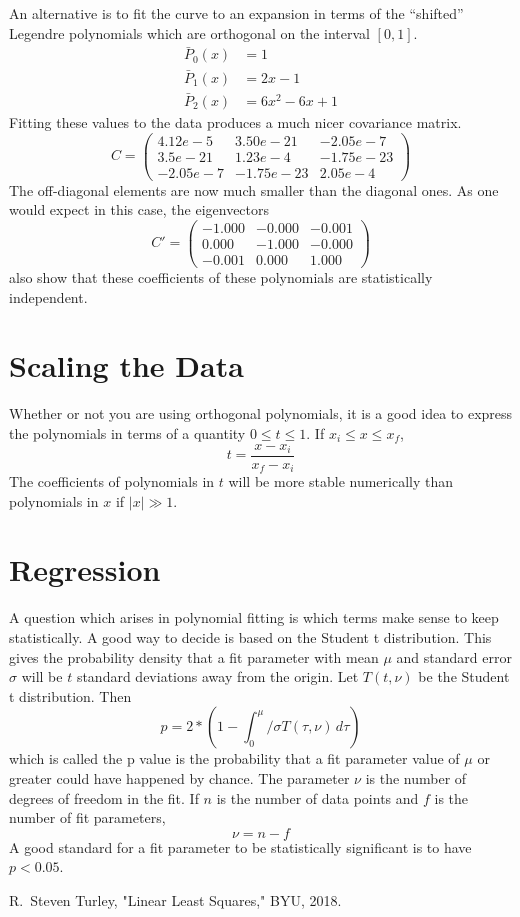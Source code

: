\documentclass{scrartcl}
\begin{document}
An alternative is to fit the curve to an expansion in terms
of the ``shifted'' Legendre polynomials which are orthogonal on
the interval $[0,1]$.
\begin{align}
\bar{P}_0(x) &= 1\\
\bar{P}_1(x) &= 2x-1\\
\bar{P}_2(x) &= 6x^2-6x+1
\end{align}
Fitting these values to the data produces a much nicer covariance
matrix.
\begin{equation}
C = \left(\begin{array}{ccc}
4.12e-5 & 3.50e-21 & -2.05e-7\\
3.5e-21 & 1.23e-4 & -1.75e-23\\
-2.05e-7 & -1.75e-23& 2.05e-4\end{array}\right)
\end{equation}
The off-diagonal elements are now much smaller than the diagonal
ones. As one would expect in this case, the eigenvectors
\begin{equation}
C' = \left(\begin{array}{ccc}
-1.000 & -0.000 & -0.001 \\
0.000 & -1.000 & -0.000 \\
-0.001 & 0.000 & 1.000\end{array}\right)
\end{equation}
also show that these coefficients of these polynomials are
statistically independent.
\section{Scaling the Data}
Whether or not you are using orthogonal polynomials, it is a good
idea to express the polynomials in terms of a quantity
$0\leq t\leq 1$. If $x_i\leq x\leq x_f$,
\begin{equation}
t = \frac{x-x_i}{x_f-x_i}
\end{equation}
The coefficients of polynomials in $t$ will be more stable
numerically than polynomials in $x$ if $|x|\gg 1$.

\section{Regression}
A question which arises in polynomial fitting is which terms
make sense to keep statistically. A good way to decide is based
on the Student t distribution. This gives the probability density
that a fit parameter with mean $\mu$ and standard error $\sigma$ will
be $t$ standard deviations away from the origin. Let
$T(t,\nu)$ be the Student t distribution. Then
\begin{equation}
p = 2*\left(1-\int_0^\mu/\sigma T(\tau,\nu)\,d\tau\right)
\end{equation}
which is called the p value is the probability that a fit
parameter value of $\mu$ or greater
could have happened by chance. The parameter $\nu$ is the
number of degrees of freedom in the fit. If $n$ is the number
of data points and $f$ is the number of fit parameters,
\begin{equation}
\nu = n-f
\end{equation}
A good standard for a fit parameter to be statistically significant
is to have $p<0.05$.

\begin{thebibliography}{9}

R.~Steven Turley, "Linear Least Squares," BYU, 2018.

\end{thebibliography}
\end{document}
